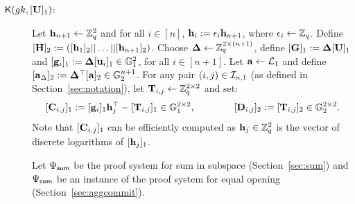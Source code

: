 \begin{description} \label{bits-proof-system}


\item[$\mathsf{K}({gk}, {[\mathbf{{U}}]_1})$:]
Let $\mathbf{h}_{n+1}\gets \mathbb{Z}_q^2$
and for all $i \in [n]$, $\mathbf{h}_{i}:=\epsilon_{i}\mathbf{h}_{n+1}$, where
$\epsilon_{i} \leftarrow \mathbb{Z}_q$. Define
$[{\mathbf{{H}}}]_2 := ([\mathbf{h}_1]_2|| \ldots ||[\mathbf{h}_{n+1}]_2)$.
Choose 
$\mathbf{{\Delta}} \leftarrow \mathbb{Z}_q^{2 \times (n+1)}$,
define $[\mathbf{{G}}]_1 := \mathbf{{\Delta}}[\mathbf{{U}}]_1$
and $[\mathbf{g}_{i}]_1:=\mathbf{{\Delta}} [\mathbf{u}_i]_1 \in \mathbb{G}_1^2$, for all $i \in [n+1]$. 
Let $\mathbf{a} \leftarrow \mathcal{L}_{1}$ and define $[\mathbf{a}_{\Delta}]_2:=\mathbf{{\Delta}}^\top[\mathbf{a}]_2 \in \mathbb{G}_2^{n+1}$. 
For any pair $(i,j) \in \mathcal{I}_{n,1}$ (as defined in Section~\ref{sec:notation}), let 
$\mathbf{{T}}_{i,j}\gets\mathbb{Z}_q^{2\times2}$ and set:
$$[\mathbf{{C}}_{i,j}]_1:=[\mathbf{g}_i]_1 \mathbf{h}_j^{\top} - [\mathbf{{T}}_{i,j}]_1  \in \mathbb{G}_1^{2 \times 2},
\qquad \qquad 
[\mathbf{{D}}_{i,j}]_2:=[\mathbf{{T}}_{i,j}]_2 \in \mathbb{G}_2^{2 \times 2}.$$ 
Note that $[\mathbf{{C}}_{i,j}]_1$ can be efficiently computed 
as $\mathbf{h}_j \in \mathbb{Z}_q^{2}$ is the vector of discrete logarithms of $[\mathbf{h}_j]_1$.

Let ${\Psi_{\mathsf{sum}}}$ be the proof system for sum in subspace 
(Section~\ref{sec:sum}) and ${\Psi_{\mathsf{com}}}$
be an instance of the proof system for equal opening (Section~\ref{sec:aggcommit}).


\end{description}
